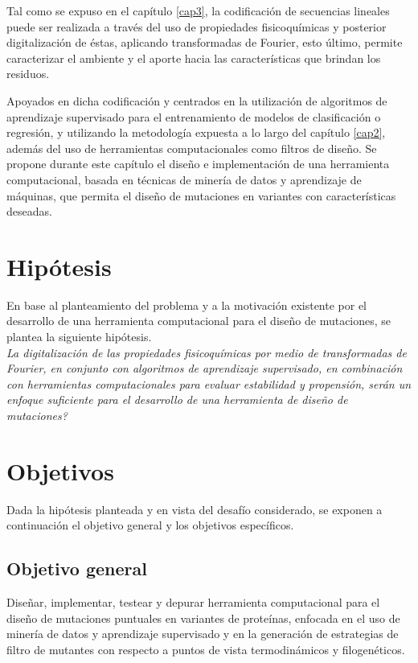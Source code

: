 Tal como se expuso en el capítulo \ref{cap3}, la codificación de secuencias lineales puede ser realizada a través del uso de propiedades fisicoquímicas y posterior digitalización de éstas, aplicando transformadas de Fourier, esto último, permite caracterizar el ambiente y el aporte hacia las características que brindan los residuos. 

Apoyados en dicha codificación y centrados en la utilización de algoritmos de aprendizaje supervisado para el entrenamiento de modelos de clasificación o regresión, y utilizando la metodología expuesta a lo largo del capítulo \ref{cap2}, además del uso de herramientas computacionales como filtros de diseño. Se propone durante este capítulo el diseño e implementación de una herramienta computacional, basada en técnicas de minería de datos y aprendizaje de máquinas, que permita el diseño de mutaciones en variantes con características deseadas.

\section{Hipótesis}

En base al planteamiento del problema y a la motivación existente por el desarrollo de una herramienta computacional para el diseño de mutaciones, se plantea la siguiente hipótesis.\\

\textit{La digitalización de las propiedades fisicoquímicas por medio de transformadas de Fourier, en conjunto con algoritmos de aprendizaje supervisado, en combinación con herramientas computacionales para evaluar estabilidad y propensión, serán un enfoque suficiente para el desarrollo de una herramienta de diseño de mutaciones?}

\section{Objetivos}

Dada la hipótesis planteada y en vista del desafío considerado, se exponen a continuación el objetivo general y los objetivos específicos.

\subsection{Objetivo general}

Diseñar, implementar, testear y depurar herramienta computacional para el diseño de mutaciones puntuales en variantes de proteínas, enfocada en el uso de minería de datos y aprendizaje supervisado y en la generación de estrategias de filtro de mutantes con respecto a puntos de vista termodinámicos y filogenéticos.

